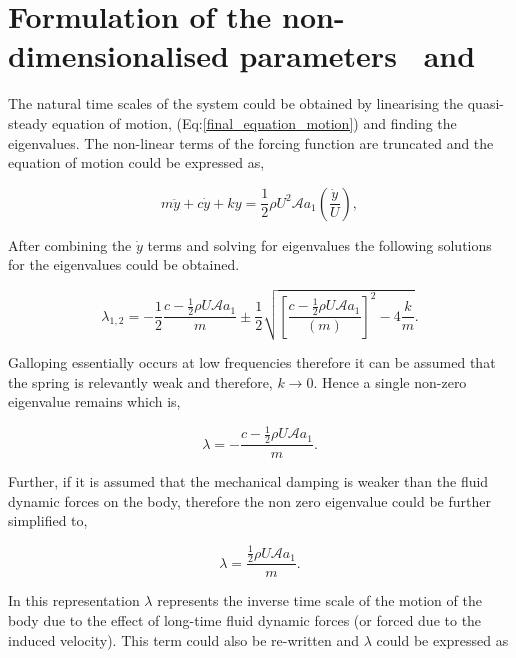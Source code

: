 \section{Formulation of the non-dimensionalised parameters \massstiff \ and \massdamp }
\label{sec: pi_1,pi_2_formulation}


The natural time scales of the system could be obtained by linearising the quasi-steady equation of motion, (Eq:\ref{final_equation_motion}) and finding the eigenvalues. The non-linear terms of the forcing function are truncated and the equation of motion could be expressed as, 

\begin{equation}
	\label{eqn:eom_linear}
	m\ddot{y}{+}c\dot{y}{+}ky{=}\frac{1}{2}\rho U^2 \mathcal{A} a_1\left(\frac{\dot{y}}{U}\right),
\end{equation}

After combining the $\dot{y}$ terms and solving for eigenvalues the following solutions for the eigenvalues could be obtained. 

\begin{equation}
	\label{eqn:eigs}
	\lambda_{1,2}= -\frac{1}{2}\frac{c-\frac{1}{2}\rho U\mathcal{A}a_1}{m}\pm\frac{1}{2}\sqrt{\left[\frac{c-\frac{1}{2}\rho U\mathcal{A}a_1}{(m)}\right]^2-4\frac{k}{m}}.
\end{equation} 

Galloping essentially occurs at low frequencies therefore it can be assumed that the spring is relevantly weak and therefore, $k \rightarrow 0$. Hence a single non-zero eigenvalue remains which is, 

\begin{equation}
	\label{eqn:eigs_nospring}
	\lambda=-\frac{c-\frac{1}{2}\rho U\mathcal{A}a_1}{m}.
\end{equation}

Further, if it is assumed that the mechanical damping is weaker than the fluid dynamic forces on the body, therefore the non zero eigenvalue could be further simplified to,

\begin{equation}
	\label{eqn:eigs_nospring_nodamp}
	\lambda=\frac{\frac{1}{2}\rho U\mathcal{A}a_1}{m}.
\end{equation}  

In this representation $\lambda$ represents the inverse time scale of the motion of the body due to the effect of long-time fluid dynamic forces (or forced due to the induced velocity). This term could also be re-written and $\lambda$ could be expressed as 

